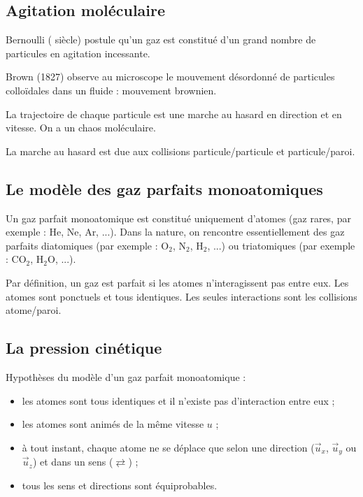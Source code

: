 \subsection{Agitation moléculaire}

Bernoulli ( siècle) postule qu'un gaz est constitué d'un grand nombre de particules en agitation incessante.

Brown (1827) observe au microscope le mouvement désordonné de particules colloïdales dans un fluide : mouvement brownien.

La trajectoire de chaque particule est une marche au hasard en direction et en vitesse. On a un chaos moléculaire.

La marche au hasard est due aux collisions particule/particule et particule/paroi.

\subsection{Le modèle des gaz parfaits monoatomiques}

Un gaz parfait monoatomique est constitué uniquement d'atomes (gaz rares, par exemple : He, Ne, Ar, ...). Dans la nature, on rencontre essentiellement des gaz parfaits diatomiques (par exemple : O\(_2\), N\(_2\), H\(_2\), ...) ou triatomiques (par exemple : CO\(_2\), H\(_2\)O, ...).

Par définition, un gaz est parfait si les atomes n'interagissent pas entre eux. Les atomes sont ponctuels et tous identiques. Les seules interactions sont les collisions atome/paroi.

\subsection{La pression cinétique}

Hypothèses du modèle d'un gaz parfait monoatomique : \begin{itemize}
\item les atomes sont tous identiques et il n'existe pas d'interaction entre eux ;

\item les atomes sont animés de la même vitesse \(u\) ;

\item à tout instant, chaque atome ne se déplace que selon une direction (\(\vec{u}_x\), \(\vec{u}_y\) ou \(\vec{u}_z\)) et dans un sens (\(\rightleftarrows\)) ;

\item tous les sens et directions sont équiprobables.\\
\end{itemize}

